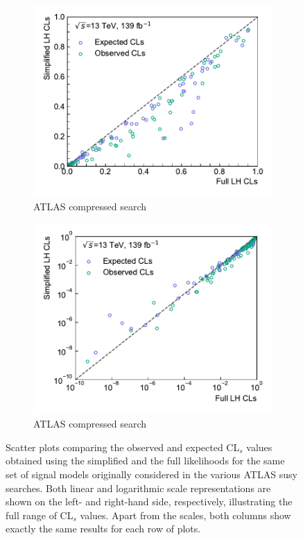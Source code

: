 \begin{figure}
\begin{subfigure}[b]{0.5\textwidth}
		\centering\includegraphics[width=\textwidth]{cls_scatter_compressed_lin}
		\caption{ATLAS compressed search~\cite{SUSY-2018-16}}
	\end{subfigure}\hfill
	\begin{subfigure}[b]{0.5\textwidth}
		\centering\includegraphics[width=\textwidth]{cls_scatter_compressed_log}
		\caption{ATLAS compressed search~\cite{SUSY-2018-16}}
	\end{subfigure}\hfill
	\caption{Scatter plots comparing the observed and expected CL$_s$ values obtained using the simplified and the full likelihoods for the same set of signal models originally considered in the various ATLAS \gls{susy} searches. Both linear and logarithmic scale representations are shown on the left- and right-hand side, respectively, illustrating the full range of CL$_s$ values. Apart from the scales, both columns show exactly the same results for each row of plots.}\label{fig:app_results_cls_2}
\end{figure}
